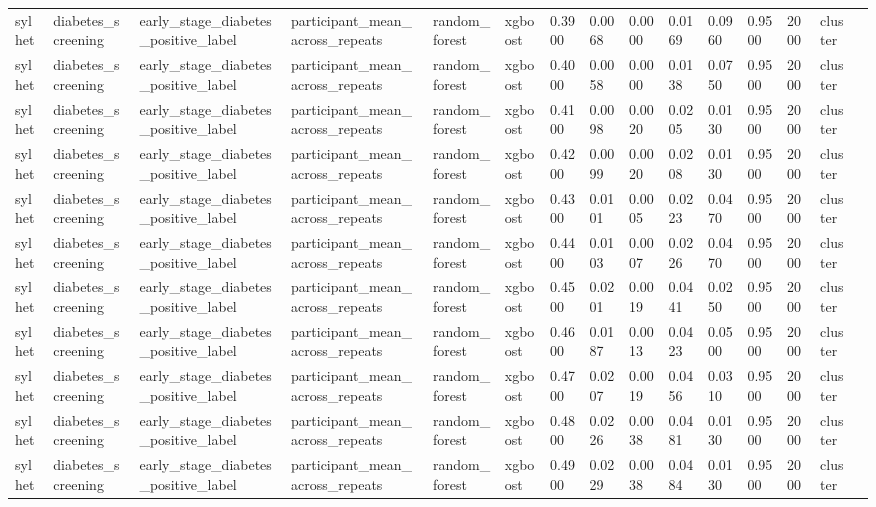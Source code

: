 \begin{tabular}{lllllllllllllll}
sylhet & diabetes\_screening & early\_stage\_diabetes\_positive\_label & participant\_mean\_across\_repeats & random\_forest & xgboost & 0.3900 & 0.0068 & 0.0000 & 0.0169 & 0.0960 & 0.9500 & 2000 & cluster &  \\
sylhet & diabetes\_screening & early\_stage\_diabetes\_positive\_label & participant\_mean\_across\_repeats & random\_forest & xgboost & 0.4000 & 0.0058 & 0.0000 & 0.0138 & 0.0750 & 0.9500 & 2000 & cluster &  \\
sylhet & diabetes\_screening & early\_stage\_diabetes\_positive\_label & participant\_mean\_across\_repeats & random\_forest & xgboost & 0.4100 & 0.0098 & 0.0020 & 0.0205 & 0.0130 & 0.9500 & 2000 & cluster &  \\
sylhet & diabetes\_screening & early\_stage\_diabetes\_positive\_label & participant\_mean\_across\_repeats & random\_forest & xgboost & 0.4200 & 0.0099 & 0.0020 & 0.0208 & 0.0130 & 0.9500 & 2000 & cluster &  \\
sylhet & diabetes\_screening & early\_stage\_diabetes\_positive\_label & participant\_mean\_across\_repeats & random\_forest & xgboost & 0.4300 & 0.0101 & 0.0005 & 0.0223 & 0.0470 & 0.9500 & 2000 & cluster &  \\
sylhet & diabetes\_screening & early\_stage\_diabetes\_positive\_label & participant\_mean\_across\_repeats & random\_forest & xgboost & 0.4400 & 0.0103 & 0.0007 & 0.0226 & 0.0470 & 0.9500 & 2000 & cluster &  \\
sylhet & diabetes\_screening & early\_stage\_diabetes\_positive\_label & participant\_mean\_across\_repeats & random\_forest & xgboost & 0.4500 & 0.0201 & 0.0019 & 0.0441 & 0.0250 & 0.9500 & 2000 & cluster &  \\
sylhet & diabetes\_screening & early\_stage\_diabetes\_positive\_label & participant\_mean\_across\_repeats & random\_forest & xgboost & 0.4600 & 0.0187 & 0.0013 & 0.0423 & 0.0500 & 0.9500 & 2000 & cluster &  \\
sylhet & diabetes\_screening & early\_stage\_diabetes\_positive\_label & participant\_mean\_across\_repeats & random\_forest & xgboost & 0.4700 & 0.0207 & 0.0019 & 0.0456 & 0.0310 & 0.9500 & 2000 & cluster &  \\
sylhet & diabetes\_screening & early\_stage\_diabetes\_positive\_label & participant\_mean\_across\_repeats & random\_forest & xgboost & 0.4800 & 0.0226 & 0.0038 & 0.0481 & 0.0130 & 0.9500 & 2000 & cluster &  \\
sylhet & diabetes\_screening & early\_stage\_diabetes\_positive\_label & participant\_mean\_across\_repeats & random\_forest & xgboost & 0.4900 & 0.0229 & 0.0038 & 0.0484 & 0.0130 & 0.9500 & 2000 & cluster &  \\

\end{tabular}
